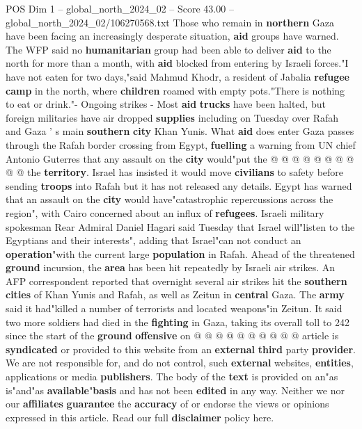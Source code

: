 \begin{textsample}{POS Dim 1 – global\_north\_2024\_02 – Score 43.00 – global\_north\_2024\_02/106270568.txt}
Those who remain in \textbf{northern} Gaza have been facing an increasingly desperate situation, \textbf{aid} groups have warned.
The WFP said no \textbf{humanitarian} group had been able to deliver \textbf{aid} to the north for more than a month, with \textbf{aid} blocked from entering by Israeli forces."I have not eaten for two days,"said Mahmud Khodr, a resident of Jabalia \textbf{refugee} \textbf{camp} in the north, where \textbf{children} roamed with empty pots."There is nothing to eat or drink."- Ongoing strikes - Most \textbf{aid} \textbf{trucks} have been halted, but foreign militaries have air dropped \textbf{supplies} including on Tuesday over Rafah and Gaza ' s main \textbf{southern} \textbf{city} Khan Yunis.
What \textbf{aid} does enter Gaza passes through the Rafah border crossing from Egypt, \textbf{fuelling} a warning from UN chief Antonio Guterres that any assault on the \textbf{city} would"put the @ @ @ @ @ @ @ @ @ @ the \textbf{territory}.
Israel has insisted it would move \textbf{civilians} to safety before sending \textbf{troops} into Rafah but it has not released any details.
Egypt has warned that an assault on the \textbf{city} would have"catastrophic repercussions across the region", with Cairo concerned about an influx of \textbf{refugees}.
Israeli military spokesman Rear Admiral Daniel Hagari said Tuesday that Israel will"listen to the Egyptians and their interests", adding that Israel"can not conduct an \textbf{operation}"with the current large \textbf{population} in Rafah.
Ahead of the threatened \textbf{ground} incursion, the \textbf{area} has been hit repeatedly by Israeli air strikes.
An AFP correspondent reported that overnight several air strikes hit the \textbf{southern} \textbf{cities} of Khan Yunis and Rafah, as well as Zeitun in \textbf{central} Gaza.
The \textbf{army} said it had"killed a number of terrorists and located weapons"in Zeitun.
It said two more soldiers had died in the \textbf{fighting} in Gaza, taking its overall toll to 242 since the start of the \textbf{ground} \textbf{offensive} on @ @ @ @ @ @ @ @ @ @ article is \textbf{syndicated} or provided to this website from an \textbf{external} \textbf{third} party \textbf{provider}.
We are not responsible for, and do not control, such \textbf{external} websites, \textbf{entities}, applications or media \textbf{publishers}.
The body of the \textbf{text} is provided on an"as is"and"as \textbf{available}"\textbf{basis} and has not been \textbf{edited} in any way.
Neither we nor our \textbf{affiliates} \textbf{guarantee} the \textbf{accuracy} of or endorse the views or opinions expressed in this article.
Read our full \textbf{disclaimer} policy here.

\end{textsample}
